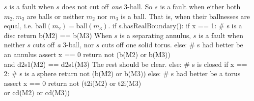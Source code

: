 \documentclass[10pt,twocolumn]{article}%
\theoremstyle{definition}
\begin{document}
$s$ is a fault when 
$s$ does not cut off \emph{one} 3-ball.
So $s$ is a fault when either both $m_2,m_3$ are
balls or neither $m_2$ nor $m_3$ is a ball.
That is, when their ballnesses are equal, i.e.
$\mbox{ball}(m_2) = \mbox{ball}(m_3)$.
\nwenddocs{}\plusendmoddef\nwstartdeflinemarkup\nwenddeflinemarkup
  if s.hasRealBoundary():
    if x == 1:
      # s is a disc
      return b(M2) == b(M3)
\nwendcode{}\nwdocspar
When $s$ is a separating
annulus, $s$ is a fault when neither
$s$ cuts off \emph{a} 3-ball, nor
$s$ cuts off one solid torus.
\nwenddocs{}\plusendmoddef\nwstartdeflinemarkup\nwenddeflinemarkup
    else:
      # s had better be an annulus
      assert x == 0
      return not (b(M2) or b(M3)) \\
         and d2s1(M2) == d2s1(M3)
\nwendcode{}\nwdocspar
The rest should be clear.
\nwenddocs{}\plusendmoddef\nwstartdeflinemarkup\nwenddeflinemarkup
  else:
    # s is closed
    if x == 2:
      # s is a sphere
      return not (b(M2) or b(M3))
    else:
      # s had better be a torus
      assert x == 0
      return not (t2i(M2) or t2i(M3) \\
             or   cd(M2)  or cd(M3))
\end{document}
